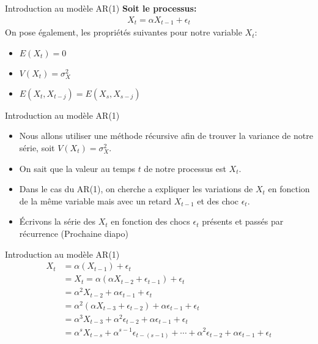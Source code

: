 \documentclass{beamer}
\begin{document}
\begin{frame}{Introduction au modèle AR(1)}
\textbf{Soit le processus:}
\begin{align*}
X_t=\alpha X_{t-1}+\epsilon_t
\end{align*}
On pose également, les propriétés suivantes pour notre variable $X_t$:
\begin{itemize}
\item $E(X_t )=0$                
\item $V(X_t )= \sigma_X^2$
\item $E(X_t,X_{t-j})=E(X_s,X_{s-j})$            
\end{itemize}
\end{frame}


\begin{frame}{Introduction au modèle AR(1)}
\begin{itemize}
\item Nous allons utiliser une méthode récursive afin de trouver la variance de notre série, soit $V(X_t)=\sigma_{X}^2$.
\item On sait que la valeur au temps $t$ de notre processus est $X_t$.
\item Dans le cas du AR(1), on cherche a expliquer les variations de $X_t$ en fonction  de la même variable mais avec un retard $X_{t-1}$ et des choc $\epsilon_t$.
\item Écrivons la série des $X_t$ en fonction des chocs $\epsilon_t$ présents et passés par récurrence (Prochaine diapo)
\end{itemize}
\end{frame}

\begin{frame}{Introduction au modèle AR(1)}
\begin{align*}
X_t & = \alpha(X_{t-1} )+ \epsilon_t\\
& = X_t= \alpha (\alpha X_{t-2}+\epsilon_{t-1})+ \epsilon_t \\
& = \alpha^2 X_{t-2}+ \alpha \epsilon_{t-1}+ \epsilon_t \\
& = \alpha^2 (\alpha X_{t-3}+\epsilon_{t-2})+\alpha \epsilon_{t-1}+\epsilon_t \\
& = \alpha^3 X_{t-3}+\alpha^2 \epsilon_{t-2}+\alpha \epsilon_{t-1}+\epsilon_t \\
& = \alpha^s X_{t-s}+\alpha^{s-1}\epsilon_{t-(s-1)}+\cdots+\alpha^2 \epsilon_{t-2}+\alpha \epsilon_{t-1}+\epsilon_t
\end{align*}
\end{frame}
\end{document}

